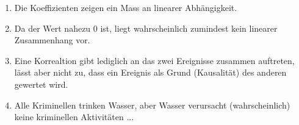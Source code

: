 \begin{enumerate}
	\item Die Koeffizienten zeigen ein Mass an linearer Abhängigkeit.
	\item Da der Wert nahezu 0 ist, liegt wahrscheinlich zumindest kein linearer Zusammenhang vor.
	\item Eine Korrealtion gibt lediglich an das zwei Ereignisse zusammen auftreten, lässt aber nicht zu, dass ein Ereignis als Grund (Kausalität) des anderen gewertet wird. 
	\item Alle Kriminellen  trinken Wasser, aber Wasser verursacht (wahrscheinlich) keine kriminellen  Aktivitäten ...
\end{enumerate}
